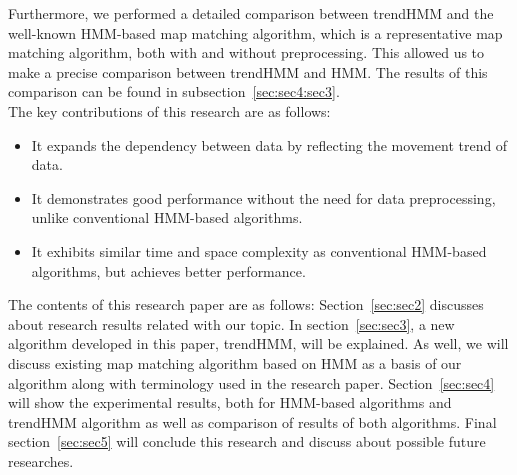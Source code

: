 \documentclass[preprint,12pt]{elsarticle}
\begin{document}
	Furthermore, we performed a detailed comparison between trendHMM and the well-known HMM-based map matching algorithm, which is a representative map matching algorithm, both with and without preprocessing. This allowed us to make a precise comparison between trendHMM and HMM. The results of this comparison can be found in subsection~\ref{sec:sec4:sec3}. 
	\\The key contributions of this research are as follows: 
	\begin{itemize}
		\item It expands the dependency between data by reflecting the movement trend of data.
		\item It demonstrates good performance without the need for data preprocessing, unlike conventional HMM-based algorithms.
		\item It exhibits similar time and space complexity as conventional HMM-based algorithms, but achieves better performance.
	\end{itemize}
	The contents of this research paper \textcolor{black}{are} as follows: Section~\ref{sec:sec2} discusses about research results related with our topic. 
	In section~\ref{sec:sec3}, a new algorithm developed in this paper, trendHMM, will be explained. As well, we will discuss existing map matching algorithm based on HMM as a basis of our algorithm along with terminology used in the research paper. 
	Section~\ref{sec:sec4} will show the experimental results, both for HMM-based algorithms and trendHMM algorithm as well as comparison of results of both algorithms.
	Final section~\ref{sec:sec5} will conclude this research and discuss about possible future researches.



\end{document}
